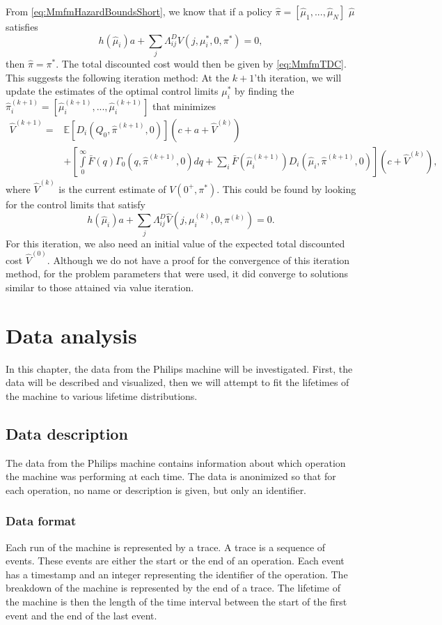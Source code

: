 \documentclass[a4paper]{thesis}
\theoremstyle{definition}
\begin{document}
From \eqref{eq:MmfmHazardBoundsShort}, we know that if a policy $\hat\pi=[\hat\mu_1,...,\hat\mu_N]$ $\hat{\mu}$ satisfies
\[
h(\hat\mu_i)a+\sum\limits_j\Lambda^D_{ij}V(j,\mu_i^*,0,\pi^*)=0,\]
then $\hat{\pi}=\pi^*$.
The total discounted cost would then be given by \eqref{eq:MmfmTDC}.
This suggests the following iteration method:
At the $k+1$'th iteration, we will update the estimates of the optimal control limits $\mu_i^*$ by finding the $\hat{\pi}_i^{(k+1)}=[\hat{\mu}_i^{(k+1)},...,\hat{\mu}_i^{(k+1)}]$ that minimizes
\[
\begin{split}
\hat{V}^{(k+1)}=&\mathbb{E}[D_{i}(Q_0,\hat\pi^{(k+1)},0)](c+a+\hat{V}^{(k)})\\
&+\left[\int\limits_0^\infty \bar{F}(q)\Gamma_0(q,\hat\pi^{(k+1)},0)dq+\sum\limits_i\bar{F}(\hat\mu_i^{(k+1)})D_{i}(\hat\mu_i,\hat\pi^{(k+1)},0)\right](c+\hat{V}^{(k)}),
\end{split}
\]
where $\hat{V}^{(k)}$ is the current estimate of $V(0^+,\pi^*)$.
This could be found by looking for the control limits that satisfy
\begin{equation}
h(\hat\mu_i)a+\sum\limits_j\Lambda^D_{ij}\hat V(j,\mu_i^{(k)},0,\pi^{(k)})=0.
\end{equation}
For this iteration, we also need an initial value of the expected total discounted cost $\hat{V}^{(0)}$.
Although we do not have a proof for the convergence of this iteration method, for the problem parameters that were used, it did converge to solutions similar to those attained via value iteration. 
\chapter{Data analysis}\label{chapter:DataAnalysis}
In this chapter, the data from the Philips machine will be investigated.
First, the data will be described and visualized, then we will attempt to fit the lifetimes of the machine to various lifetime distributions.
\section{Data description}
The data from the Philips machine contains information about which operation the machine was performing at each time.
The data is anonimized so that for each operation, no name or description is given, but only an identifier.
\subsection{Data format}
Each run of the machine is represented by a trace.
A trace is a sequence of events.
These events are either the start or the end of an operation.
Each event has a timestamp and an integer representing the identifier of the operation.
The breakdown of the machine is represented by the end of a trace.
The lifetime of the machine is then the length of the time interval between the start of the first event and the end of the last event.
\end{document}
